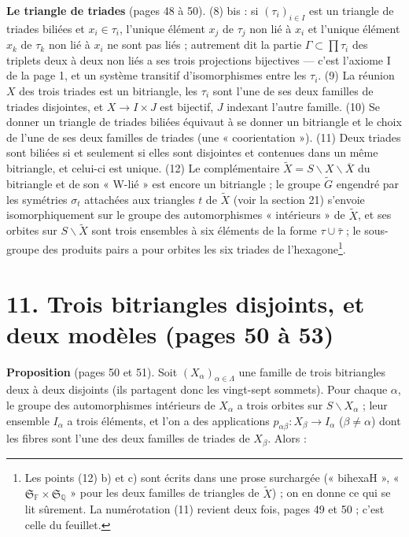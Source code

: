 \documentclass[11pt,a4paper]{article}
\begin{document}
\textbf{Le triangle de triades} (pages 48 à 50). (8) bis : si
$(\tau_i)_{i\in I}$ est un triangle de triades biliées et $x_i \in \tau_i$,
l'unique élément $x_j$ de $\tau_j$ non lié à $x_i$ et l'unique élément $x_k$ de
$\tau_k$ non lié à $x_i$ ne sont pas liés ; autrement dit la partie $\Gamma
\subset \prod \tau_i$ des triplets deux à deux non liés a ses trois projections
bijectives --- c'est l'axiome I de la page 1, et un système transitif
d'isomorphismes entre les $\tau_i$. (9) La réunion $X$ des trois triades est un
bitriangle, les $\tau_i$ sont l'une de ses deux familles de triades disjointes,
et $X \to I \times J$ est bijectif, $J$ indexant l'autre famille. (10) Se
donner un triangle de triades biliées équivaut à se donner un bitriangle et
le choix de l'une de ses deux familles de triades (une « coorientation »).
(11) Deux triades sont biliées si et seulement si elles sont disjointes et
contenues dans un même bitriangle, et celui-ci est unique. (12) Le
complémentaire $\widetilde X = S \smallsetminus X \smallsetminus \overline X$
du bitriangle et de son « W-lié » est encore un bitriangle ; le groupe
$\widetilde G$ engendré par les symétries $\sigma_t$ attachées aux triangles $t$
de $\widetilde X$ (voir la section 21) s'envoie isomorphiquement sur le groupe
des automorphismes « intérieurs » de $\widetilde X$, et ses orbites sur $S
\smallsetminus \widetilde X$ sont trois ensembles à six éléments de la forme
$\tau \cup \bar\tau$ ; le sous-groupe des produits pairs a pour orbites les six
triades de l'hexagone\footnote{Les points (12) b) et c) sont écrits dans une
prose surchargée (« bihexaH », « $\mathfrak{S}_{\mathbb{F}} \times
\mathfrak{S}_{\mathbb{Q}}$ » pour les deux familles de triangles de $\widetilde
X$) ; on en donne ce qui se lit sûrement. La numérotation (11) revient deux
fois, pages 49 et 50 ; c'est celle du feuillet.}.

\section*{11. Trois bitriangles disjoints, et deux modèles (pages 50 à 53)}

\textbf{Proposition} (pages 50 et 51). Soit $(X_\alpha)_{\alpha \in \Lambda}$
une famille de trois bitriangles deux à deux disjoints (ils partagent donc les
vingt-sept sommets). Pour chaque $\alpha$, le groupe des automorphismes
intérieurs de $X_\alpha$ a trois orbites sur $S \smallsetminus X_\alpha$ ;
leur ensemble $I_\alpha$ a trois éléments, et l'on a des applications $p_{\alpha
\beta} : X_\beta \to I_\alpha$ ($\beta \neq \alpha$) dont les fibres sont l'une
des deux familles de triades de $X_\beta$. Alors :
\end{document}
